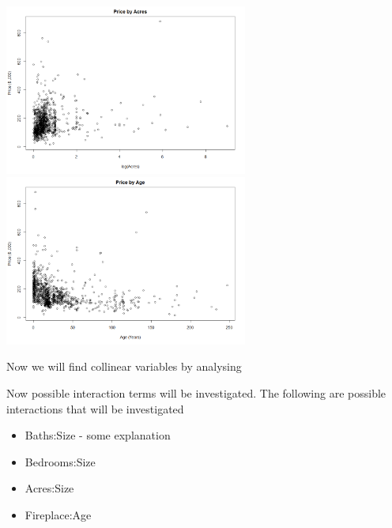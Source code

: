 \documentclass[10pt,A4,makeidx]{article}
\begin{document}
  \begin{center}
    \includegraphics[width=8cm]{price-acres.png}
    \includegraphics[width=8cm]{price-age.png}
  \end{center}
  
  Now we will find collinear variables by analysing 
  

  Now possible interaction terms will be investigated. The following are possible 
  interactions that will be investigated
  \begin{itemize}
  \item Baths:Size - some explanation
  \item Bedrooms:Size
  \item Acres:Size
  \item Fireplace:Age
  \end{itemize}
\end{document}
